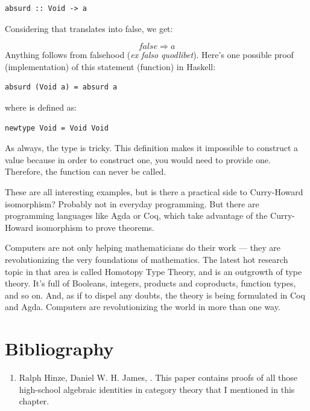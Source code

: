 \begin{Verbatim}
absurd :: Void -> a
\end{Verbatim}
Considering that  translates into false, we get:

\[false \Rightarrow a\]
Anything follows from falsehood (\emph{ex falso quodlibet}). Here's one
possible proof (implementation) of this statement (function) in Haskell:

\begin{Verbatim}
absurd (Void a) = absurd a
\end{Verbatim}
where  is defined as:

\begin{Verbatim}
newtype Void = Void Void
\end{Verbatim}
As always, the type  is tricky. This definition makes it
impossible to construct a value because in order to construct one, you
would need to provide one. Therefore, the function  can
never be called.

These are all interesting examples, but is there a practical side to
Curry-Howard isomorphism? Probably not in everyday programming. But
there are programming languages like Agda or Coq, which take advantage
of the Curry-Howard isomorphism to prove theorems.

Computers are not only helping mathematicians do their work --- they are
revolutionizing the very foundations of mathematics. The latest hot
research topic in that area is called Homotopy Type Theory, and is an
outgrowth of type theory. It's full of Booleans, integers, products and
coproducts, function types, and so on. And, as if to dispel any doubts,
the theory is being formulated in Coq and Agda. Computers are
revolutionizing the world in more than one way.

\section{Bibliography}

\begin{enumerate}
\tightlist
\item
  Ralph Hinze, Daniel W. H. James,
  . This paper contains proofs of all those high-school
  algebraic identities in category theory that I mentioned in this
  chapter.
\end{enumerate}